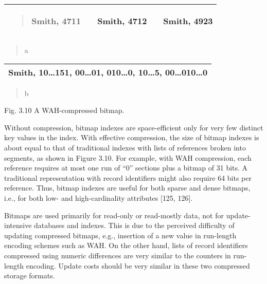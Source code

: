 \begin{longtable}[]{@{}lllll@{}}
\toprule
\endhead
\begin{minipage}[t]{0.17\columnwidth}\raggedright
\begin{quote}
Smith, 4711
\end{quote}\strut
\end{minipage} & \begin{minipage}[t]{0.17\columnwidth}\raggedright
\strut
\end{minipage} & \begin{minipage}[t]{0.17\columnwidth}\raggedright
Smith, 4712\strut
\end{minipage} & \begin{minipage}[t]{0.17\columnwidth}\raggedright
\strut
\end{minipage} & \begin{minipage}[t]{0.17\columnwidth}\raggedright
Smith, 4923\strut
\end{minipage}\tabularnewline
\bottomrule
\end{longtable}

\begin{quote}
a
\end{quote}

\begin{longtable}[]{@{}l@{}}
\toprule
\endhead
Smith, {10}\ldots{}151, {0}0\ldots{}01, {0}10\ldots{}0, {10}\ldots{}5,
{0}0\ldots{}010\ldots{}0\tabularnewline
\bottomrule
\end{longtable}

\begin{quote}
b
\end{quote}

Fig. 3.10 A WAH-compressed bitmap.

Without compression, bitmap indexes are space-efficient only for very
few distinct key values in the index. With effective compression, the
size of bitmap indexes is about equal to that of traditional indexes
with lists of references broken into segments, as shown in Figure 3.10.
For example, with WAH compression, each reference requires at most one
run of ``0'' sections plus a bitmap of 31 bits. A traditional
representation with record identifiers might also require 64 bits per
reference. Thus, bitmap indexes are useful for both sparse and dense
bitmaps, i.e., for both low- and high-cardinality attributes {[}125,
126{]}.

Bitmaps are used primarily for read-only or read-mostly data, not for
update-intensive databases and indexes. This is due to the perceived
difficulty of updating compressed bitmaps, e.g., insertion of a new
value in run-length encoding schemes such as WAH. On the other hand,
lists of record identifiers compressed using numeric differences are
very similar to the counters in run-length encoding. Update costs should
be very similar in these two compressed storage formats.

